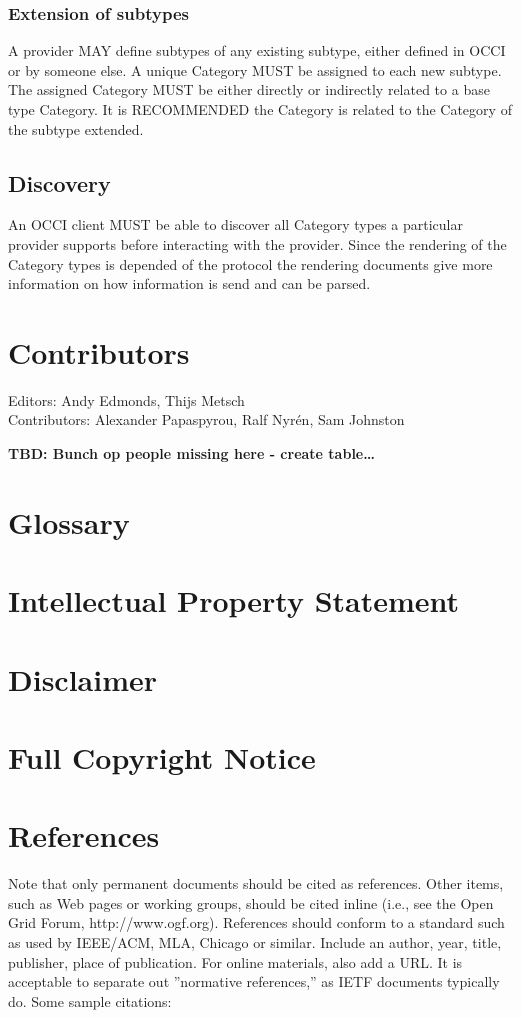 \documentclass[10pt,a4paper,british]{article}
\begin{document}
\subsubsection{Extension of subtypes}
A provider MAY define subtypes of any existing subtype, either defined
in OCCI or by someone else. A unique Category MUST be assigned to each
new subtype. The assigned Category MUST be either directly or
indirectly related to a base type Category. It is RECOMMENDED the
Category is related to the Category of the subtype extended.

\subsection{Discovery}
An OCCI client MUST be able to discover all Category types a
particular provider supports before interacting with the
provider. Since the rendering of the Category types is depended of the
protocol the rendering documents give more information on how
information is send and can be parsed.

\section{Contributors}
Editors: Andy Edmonds, Thijs Metsch \\
Contributors: Alexander Papaspyrou, Ralf Nyrén, Sam Johnston

\textbf{TBD: Bunch op people missing here - create table\ldots}

\section{Glossary}
\label{sec:glossary}



\section{Intellectual Property Statement}


\section{Disclaimer}


\section{Full Copyright Notice}


\section{References}

Note that only permanent documents should be cited as
references. Other items, such as Web pages or working groups, should
be cited inline (i.e., see the Open Grid Forum,
http://www.ogf.org). References should conform to a standard such as
used by IEEE/ACM, MLA, Chicago or similar. Include an author, year,
title, publisher, place of publication. For online materials, also add
a URL. It is acceptable to separate out ''normative references,'' as
IETF documents typically do. Some sample citations:
\end{document}
